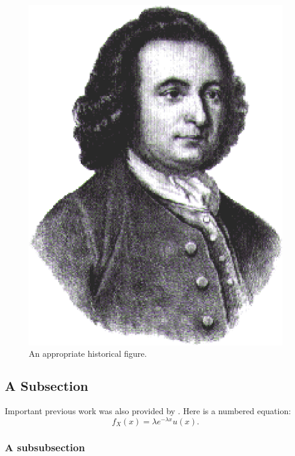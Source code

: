 \begin{figure}
  \centering
  \includegraphics[scale=0.3]{figGeorgeMason}
  \caption[An appropriate historical figure]{An appropriate historical figure.}

  \figSpace
\end{figure}

\subsection{A Subsection}

Important previous work was also provided by \cite{Shannon49}.  Here is a numbered equation:
\begin{equation}
    f_X(x) = \lambda e^{-\lambda x} u(x).
\end{equation}

\subsubsection{A subsubsection}

